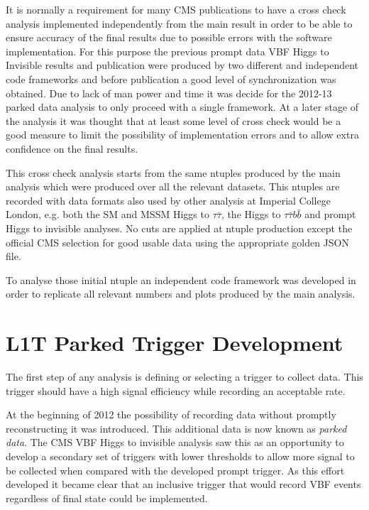 It is normally a requirement for many CMS publications to have a cross check analysis implemented independently from the main result in order to be able to ensure accuracy of the final results due to possible errors with the software implementation. For this purpose the previous prompt data \gls{VBF} Higgs to Invisible results and publication were produced by two different and independent code frameworks and before publication a good level of synchronization was obtained. Due to lack of man power and time it was decide for the 2012-13 parked data analysis to only proceed with a single framework. At a later stage of the analysis it was thought that at least some level of cross check would be a good measure to limit the possibility of implementation errors and to allow extra confidence on the final results.
 
This cross check analysis starts from the same ntuples produced by the main analysis which were produced over all the relevant datasets. This ntuples are recorded with data formats also used by other analysis at Imperial College London, e.g. both the \gls{SM} and \gls{MSSM} Higgs to $\tau\bar{\tau}$, the Higgs to $\tau\bar{\tau}b\bar{b}$ and prompt Higgs to invisible analyses. No cuts are applied at ntuple production except the official \gls{CMS} selection for good usable data using the appropriate golden \gls{JSON} file.
 
To analyse those initial ntuple an independent code framework was developed in order to replicate all relevant numbers and plots produced by the main analysis.

\section{L1T Parked Trigger Development}
\label{SECTION:ParkedDataAnalysis_ParkedTriggerDevelopment}

The first step of any analysis is defining or selecting a trigger to collect data. This trigger should have a high signal efficiency while recording an acceptable rate.

At the beginning of 2012 the possibility of recording data without promptly reconstructing it was introduced. This additional data is now known as \textit{parked data}. The \gls{CMS} \gls{VBF} Higgs to invisible analysis saw this as an opportunity to develop a secondary set of triggers with lower thresholds to allow more signal to be collected when compared with the developed prompt trigger. As this effort developed it became clear that an inclusive trigger that would record \gls{VBF} events regardless of final state could be implemented.

